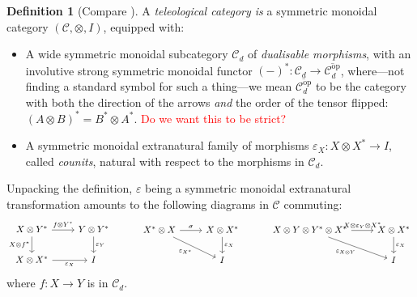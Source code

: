 \documentclass[11pt,a4paper]{article}
\theoremstyle{plain}
\theoremstyle{definition}
\newtheorem{definition}[theorem]{Definition}
\newcommand{\C}{\mathscr{C}}
\newcommand{\op}{\mathrm{op}}
\newcommand{\todo}[1]{\textcolor{red}{\small #1}}
\begin{document}
\begin{definition}[Compare {\cite[Definition 5.1]{CoherenceForLenses}}]
  A \emph{teleological category is} a symmetric monoidal category $(\C, \otimes, I)$, equipped with:
  \begin{itemize}
  \item A wide symmetric monoidal subcategory $\C_d$ of \emph{dualisable morphisms}, with an involutive strong symmetric monoidal functor ${(-)}^* : \C_d \to \overline{\C_d^\op}$, where---not finding a standard symbol for such a thing---we mean $\overline{\C_d^\op}$ to be the category with both the direction of the arrows \emph{and} the order of the tensor flipped: ${(A \otimes B)}^* = B^* \otimes A^*$. \todo{Do we want this to be strict?}
  \item A symmetric monoidal extranatural family of morphisms $\varepsilon_X : X \otimes X^* \to I$, called \emph{counits}, natural with respect to the morphisms in $\C_d$.
  \end{itemize}
\end{definition}
Unpacking the definition, $\varepsilon$ being a symmetric monoidal extranatural transformation amounts to the following diagrams in $\C$ commuting:
\[
  \begin{tikzcd}
    X \otimes Y^* \ar[r, "f \otimes Y^*"]  \ar[d, "X \otimes f^*", swap] & Y \otimes Y^* \ar[d, "\varepsilon_Y"] \\
    X \otimes X^* \ar[r, "\varepsilon_X", swap] & I
  \end{tikzcd} \hspace{1cm}
  \begin{tikzcd}
    X^* \otimes X \ar[r, "\sigma"]  \ar[dr, "\varepsilon_{X^*}", swap] & X \otimes X^* \ar[d, "\varepsilon_X"] \\
    & I
  \end{tikzcd} \hspace{1cm}
  \begin{tikzcd}
    X \otimes Y \otimes Y^* \otimes X^* \ar[r, "X \otimes \varepsilon_Y \otimes X^*"]  \ar[dr, "\varepsilon_{X \otimes Y}", swap] & X \otimes X^* \ar[d, "\varepsilon_X"] \\
    & I
  \end{tikzcd}
\]
where $f : X \to Y$ is in $\C_d$.
\end{document}
